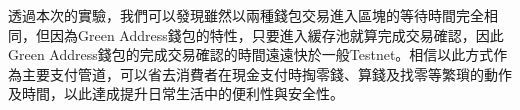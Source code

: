 
	透過本次的實驗，我們可以發現雖然以兩種錢包交易進入區塊的等待時間完全相同，但因為Green Address錢包的特性，只要進入緩存池就算完成交易確認，因此Green Address錢包的完成交易確認的時間遠遠快於一般Testnet。相信以此⽅式作為主要⽀付管道，可以省去消費者在現金⽀付時掏零錢、算錢及找零等繁瑣的動作及時間，以此達成提升⽇常⽣活中的便利性與安全性。